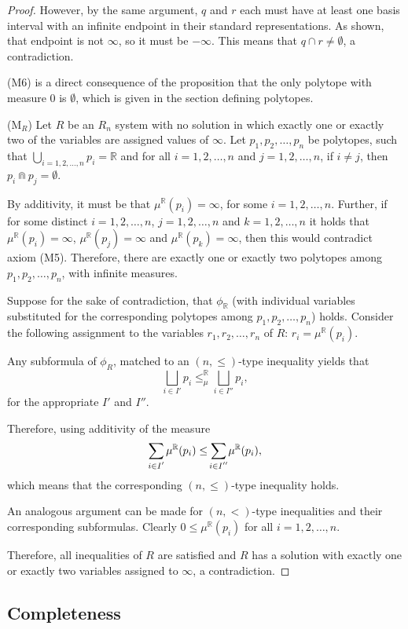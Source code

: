\documentclass{article}
\newcommand{\R}{\mathbb{R}}
\newcommand{\bcap}{\Cap}
\newcommand{\bmeasure}{\leq_\mu^\R}
\begin{document}
\begin{proof}
    However, by the same argument, $q$ and $r$ each must have at least one basis interval with an infinite endpoint in their standard representations. As shown, that endpoint is not $\infty$, so it must be $-\infty$. This means that $q \cap r \neq \emptyset$, a contradiction.

    (M6) is a direct consequence of the proposition that the only polytope with measure 0 is $\emptyset$, which is given in the section defining polytopes.

    (M$_R$) Let $R$ be an $R_n$ system with no solution in which exactly one or exactly two of the variables are assigned values of $\infty$. Let $p_1, p_2, \dots, p_n$ be polytopes, such that $\bigcup_{i = 1, 2, \dots, n}p_i = \R$ and for all $i = 1, 2, \dots, n$ and $j = 1, 2, \dots, n$, if $i \neq j$, then $p_i \bcap p_j = \emptyset$.

    By additivity, it must be that $\mu^\R(p_i) = \infty$, for some $i = 1, 2, \dots, n$. Further, if for some distinct $i = 1, 2, \dots, n$, $j = 1, 2, \dots, n$ and $k = 1, 2, \dots, n$ it holds that $\mu^\R(p_i) = \infty$, $\mu^\R(p_j) = \infty$ and $\mu^\R(p_k) = \infty$, then this would contradict axiom (M5). Therefore, there are exactly one or exactly two polytopes among $p_1, p_2, \dots, p_n$, with infinite measures.

    Suppose for the sake of contradiction, that $\phi_\R$ (with individual variables substituted for the corresponding polytopes among $p_1, p_2, \dots, p_n$) holds. Consider the following assignment to the variables $r_1, r_2, \dots, r_n$ of $R$: $r_i = \mu^\R(p_i)$.

    Any subformula of $\phi_R$, matched to an $(n, \leq)$-type inequality yields that
    \[
        \bigsqcup_{i \in I'}p_i \bmeasure \bigsqcup_{i \in I''}p_i,
        \] for the appropriate $I'$ and $I''$.

        Therefore, using additivity of the measure \[
        \sum_{\mathclap{i \in I'}}\mu^\R(p_i) \leq \sum_{\mathclap{i \in I''}}\mu^\R(p_i),
        \]
        which means that the corresponding $(n, \leq)$-type inequality holds.

        An analogous argument can be made for $(n, <)$-type inequalities and their corresponding subformulas. Clearly $0 \leq \mu^\R(p_i)$ for all $i = 1, 2, \dots, n$.

        Therefore, all inequalities of $R$ are satisfied and $R$ has a solution with exactly one or exactly two variables assigned to $\infty$, a contradiction.
\end{proof}
\subsection{Completeness}
\end{document}
